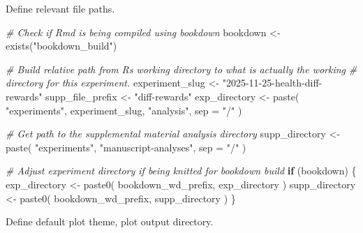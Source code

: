 \documentclass[
]{book}
\newenvironment{Shaded}{\begin{snugshade}}{\end{snugshade}}
\newcommand{\AttributeTok}[1]{\textcolor[rgb]{0.77,0.63,0.00}{#1}}
\newcommand{\CommentTok}[1]{\textcolor[rgb]{0.56,0.35,0.01}{\textit{#1}}}
\newcommand{\ControlFlowTok}[1]{\textcolor[rgb]{0.13,0.29,0.53}{\textbf{#1}}}
\newcommand{\FunctionTok}[1]{\textcolor[rgb]{0.00,0.00,0.00}{#1}}
\newcommand{\NormalTok}[1]{#1}
\newcommand{\OtherTok}[1]{\textcolor[rgb]{0.56,0.35,0.01}{#1}}
\newcommand{\StringTok}[1]{\textcolor[rgb]{0.31,0.60,0.02}{#1}}
\begin{document}
Define relevant file paths.

\begin{Shaded}
\begin{Highlighting}[]
\CommentTok{\# Check if Rmd is being compiled using bookdown}
\NormalTok{bookdown }\OtherTok{\textless{}{-}} \FunctionTok{exists}\NormalTok{(}\StringTok{"bookdown\_build"}\NormalTok{)}

\CommentTok{\# Build relative path from R\textquotesingle{}s working directory to what is actually the working}
\CommentTok{\# directory for this experiment.}
\NormalTok{experiment\_slug }\OtherTok{\textless{}{-}} \StringTok{"2025{-}11{-}25{-}health{-}diff{-}rewards"}
\NormalTok{supp\_file\_prefix }\OtherTok{\textless{}{-}} \StringTok{"diff{-}rewards"}
\NormalTok{exp\_directory }\OtherTok{\textless{}{-}} \FunctionTok{paste}\NormalTok{(}
  \StringTok{"experiments"}\NormalTok{,}
\NormalTok{  experiment\_slug,}
  \StringTok{"analysis"}\NormalTok{,}
  \AttributeTok{sep =} \StringTok{"/"}
\NormalTok{)}

\CommentTok{\# Get path to the supplemental material analysis directory}
\NormalTok{supp\_directory }\OtherTok{\textless{}{-}} \FunctionTok{paste}\NormalTok{(}
  \StringTok{"experiments"}\NormalTok{,}
  \StringTok{"manuscript{-}analyses"}\NormalTok{,}
  \AttributeTok{sep =} \StringTok{"/"}
\NormalTok{)}

\CommentTok{\# Adjust experiment directory if being knitted for bookdown build}
\ControlFlowTok{if}\NormalTok{ (bookdown) \{}
\NormalTok{  exp\_directory }\OtherTok{\textless{}{-}} \FunctionTok{paste0}\NormalTok{(}
\NormalTok{    bookdown\_wd\_prefix,}
\NormalTok{    exp\_directory}
\NormalTok{  )}
\NormalTok{  supp\_directory }\OtherTok{\textless{}{-}} \FunctionTok{paste0}\NormalTok{(}
\NormalTok{    bookdown\_wd\_prefix,}
\NormalTok{    supp\_directory}
\NormalTok{  )}
\NormalTok{\}}
\end{Highlighting}
\end{Shaded}

Define default plot theme, plot output directory.
\end{document}
